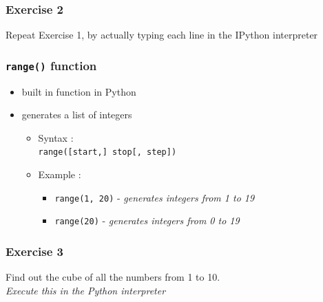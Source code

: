 \documentclass[17pt]{beamer}
\begin{document}
\begin{frame}[fragile]
\frametitle{Exercise 2}
Repeat Exercise 1, by actually typing each line in the IPython interpreter

\end{frame}
\begin{frame}
\frametitle{\texttt{range()} function}
    \begin{itemize}
    \item built in function in Python
    \item generates a list of integers
        \begin{itemize}
        \item Syntax :\\ \texttt{range([start,] stop[, step])}
        \item Example :
            \begin{itemize}
            \item \texttt{range(1, 20)} - \emph{generates integers from 1 to 19}
            \item \texttt{range(20)} - \emph{generates integers from 0 to 19}
            \end{itemize}
        \end{itemize}
    \end{itemize}
\end{frame}
\begin{frame}[fragile]
\frametitle{Exercise 3}
  Find out the cube of all the numbers from 1 to 10.\\\pause 
  \emph{Execute this in the Python interpreter}
\end{frame}
\end{document}
